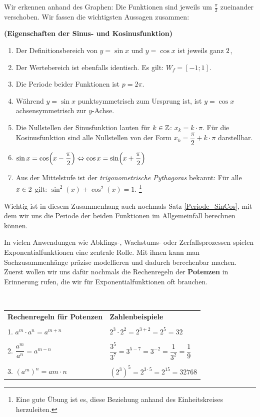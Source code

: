\documentclass[ngerman, 12pt]{nssheetxea}
\begin{document}
Wir erkennen anhand des Graphen: Die Funktionen sind jeweils um $\frac{\pi}{2}$ zueinander verschoben. Wir fassen die wichtigsten Aussagen zusammen:
\begin{theorem} \textbf{(Eigenschaften der Sinus- und Kosinusfunktion)}
\begin{enumerate}
\item Der Definitionsbereich von $y=\sin x$ und $y=\cos x$ ist jeweils ganz $2$,
\item Der Wertebereich ist ebenfalls identisch. Es gilt: $W_f = [-1;1]$.
\item Die Periode beider Funktionen ist $p=2\pi$.
\item Während $y=\sin x$ punktsymmetrisch zum Ursprung ist, ist $y=\cos x$ achsensymmetrisch zur $y$-Achse. 
\item Die Nullstellen der Sinusfunktion lauten für $k \in \mathbb{Z}$: $x_k=k \cdot \pi$. Für die Kosinusfunktion sind alle Nullstellen von der Form $x_k=\dfrac{\pi}{2}+k \cdot \pi$ darstellbar.
\item $\sin x = \cos \mleft( x-\dfrac{\pi}{2} \mright) \Leftrightarrow \cos x = \sin \mleft( x + \dfrac{\pi}{2}  \mright)$
\item Aus der Mittelstufe ist der \textit{trigonometrische Pythagoras} bekannt: Für alle $x\in 2$ gilt: $\sin^2 (x) + \cos^2 (x) = 1$. \footnote{Eine gute Übung ist es, diese Beziehung anhand des Einheitskreises herzuleiten.}
\end{enumerate}
\end{theorem}
Wichtig ist in diesem Zusammenhang auch nochmals Satz \ref{Periode_SinCos}, mit dem wir uns die Periode der beiden Funktionen im Allgemeinfall berechnen können.

In vielen Anwendungen wie Abklings-, Wachstums- oder Zerfallsprozessen spielen Exponentialfunktionen eine zentrale Rolle. Mit ihnen kann man Sachzusammenhänge präzise modellieren und dadurch berechenbar machen. Zuerst wollen wir uns dafür nochmals die Rechenregeln der \textbf{Potenzen} in Erinnerung rufen, die wir für Exponentialfunktionen oft brauchen. 

\begin{theorem} \ \par
\begin{tabularx}{\textwidth}{X X}
\setstretch{2}
\textbf{Rechenregeln für Potenzen} & \textbf{Zahlenbeispiele} \\
\\
1.   $a^m\cdot a^n=a^{m+n}$ & $2^3\cdot 2^2=2^{3+2} = 2^5 = 32$ \\
\\
2.   $\dfrac{a^m}{a^n}=a^{m-n}$ & $\dfrac{3^5}{3^7}=3^{5-7}=3^{-2}=\dfrac{1}{3^2}=\dfrac{1}{9}$ \\
\\
3.   $(a^m)^n=a{m\cdot n}$ & $(2^3)^5=2^{3\cdot 5}=2^{15}=32768$
\index{Potenzen}
\end{tabularx}
\end{theorem}
\end{document}
